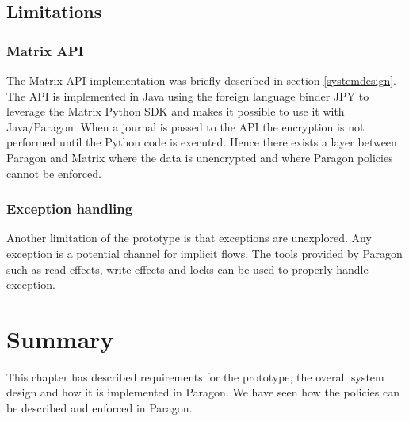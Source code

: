 
\subsection{Limitations}

\subsubsection{Matrix API}
The Matrix API implementation was briefly described in section \ref{systemdesign}. The API is implemented in Java using the foreign language binder JPY to leverage the Matrix Python SDK and makes it possible to use it with Java/Paragon. When a journal is passed to the API the encryption is not performed until the Python code is executed. Hence there exists a layer between Paragon and Matrix where the data is unencrypted and where Paragon policies cannot be enforced.

\subsubsection{Exception handling}
Another limitation of the prototype is that exceptions are unexplored. Any exception is a potential channel for implicit flows. The tools provided by Paragon such as read effects, write effects and locks can be used to properly handle exception.





\section{Summary}
This chapter has described requirements for the prototype, the overall system design and how it is implemented in Paragon. We have seen how the policies can be described and enforced in Paragon. 